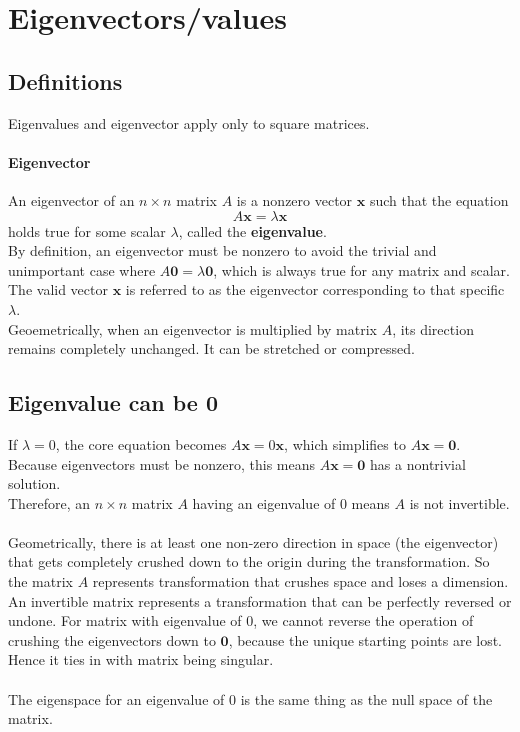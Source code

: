 \documentclass[../linear-algebra.tex]{subfiles}
\begin{document}
\section{Eigenvectors/values}
\subsection{Definitions}
Eigenvalues and eigenvector apply only to square matrices.
\paragraph{Eigenvector} An eigenvector of an $n \times n$ matrix $A$ is a nonzero vector $\mathbf{x}$ such that the equation
$$A\mathbf{x}=\lambda \mathbf{x}$$
holds true for some scalar $\lambda$, called the \textbf{eigenvalue}.\\
By definition, an eigenvector must be nonzero to avoid the trivial and unimportant case where $A\mathbf{0}=\lambda\mathbf{0}$, which is always true for any matrix and scalar.\\
The valid vector $\mathbf{x}$ is referred to as the eigenvector corresponding to that specific $\lambda$.\\
Geoemetrically, when an eigenvector is multiplied by matrix $A$, its direction remains completely unchanged. It can be stretched or compressed.

\subsection{Eigenvalue can be 0}
If $\lambda = 0$, the core equation becomes $A\mathbf{x} = 0\mathbf{x}$, which simplifies to $A\mathbf{x} = \mathbf{0}$.\\
Because eigenvectors must be nonzero, this means $A\mathbf{x} = \mathbf{0}$ has a nontrivial solution.\\
Therefore, an $n \times n$ matrix $A$ having an eigenvalue of 0 means $A$ is not invertible.\\
\\
Geometrically, there is at least one non-zero direction in space (the eigenvector) that gets completely crushed down to the origin during the transformation.
So the matrix $A$ represents transformation that crushes space and loses a dimension.\\
An invertible matrix represents a transformation that can be perfectly reversed or undone. For matrix with eigenvalue of 0, we cannot reverse the operation of crushing the eigenvectors down to $\mathbf{0}$, because the unique starting points are lost.
Hence it ties in with matrix being singular.\\
\\
The eigenspace for an eigenvalue of $0$ is the same thing as the null space of the matrix.
\end{document}

